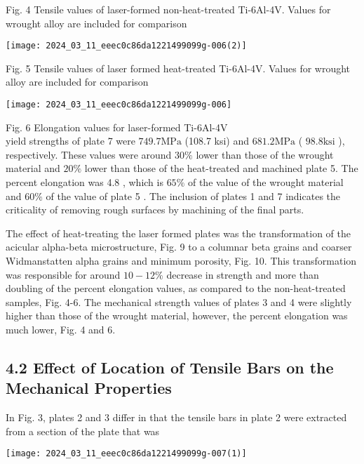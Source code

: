 \documentclass[10pt]{article}
\begin{document}
Fig. 4 Tensile values of laser-formed non-heat-treated Ti-6Al-4V. Values for wrought alloy are included for comparison

\begin{center}
\texttt{[image: 2024\_03\_11\_eeec0c86da1221499099g-006(2)]}
\end{center}

Fig. 5 Tensile values of laser formed heat-treated Ti-6Al-4V. Values for wrought alloy are included for comparison

\begin{center}
\texttt{[image: 2024\_03\_11\_eeec0c86da1221499099g-006]}
\end{center}

Fig. 6 Elongation values for laser-formed Ti-6Al-4V\\
yield strengths of plate 7 were $749.7 \mathrm{MPa}$ (108.7 ksi) and $681.2 \mathrm{MPa}$ ( $98.8 \mathrm{ksi}$ ), respectively. These values were around $30 \%$ lower than those of the wrought material and $20 \%$ lower than those of the heat-treated and machined plate 5. The percent elongation was 4.8 , which is $65 \%$ of the value of the wrought material and $60 \%$ of the value of plate 5 . The inclusion of plates 1 and 7 indicates the criticality of removing rough surfaces by machining of the final parts.

The effect of heat-treating the laser formed plates was the transformation of the acicular alpha-beta microstructure, Fig. 9 to a columnar beta grains and coarser Widmanstatten alpha grains and minimum porosity, Fig. 10. This transformation was responsible for around $10-12 \%$ decrease in strength and more than doubling of the percent elongation values, as compared to the non-heat-treated samples, Fig. 4-6. The mechanical strength values of plates 3 and 4 were slightly higher than those of the wrought material, however, the percent elongation was much lower, Fig. 4 and 6.

\subsection*{4.2 Effect of Location of Tensile Bars on the Mechanical Properties}
In Fig. 3, plates 2 and 3 differ in that the tensile bars in plate 2 were extracted from a section of the plate that was

\begin{center}
\texttt{[image: 2024\_03\_11\_eeec0c86da1221499099g-007(1)]}
\end{center}
\end{document}
